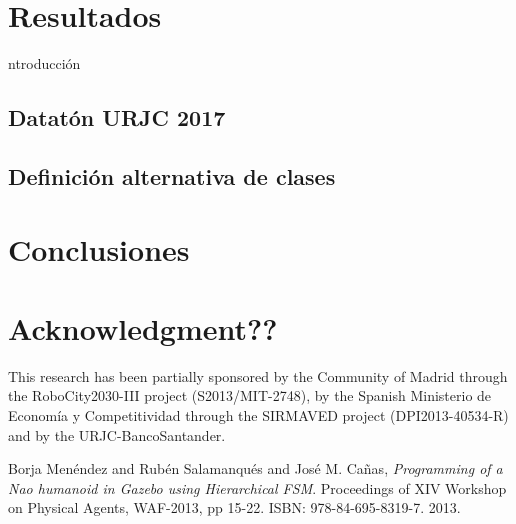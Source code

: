 \documentclass[journal,twoside]{JoPhA}
\begin{document}
\section{Resultados}
ntroducción
	\subsection{Datatón URJC 2017}

	\subsection{Definición alternativa de clases}


\section{Conclusiones}

\section*{Acknowledgment??}
This  research  has  been  partially  sponsored  by  the Community of Madrid through the RoboCity2030-III project (S2013/MIT-2748), by the Spanish Ministerio de Economía y Competitividad through the SIRMAVED project (DPI2013-40534-R) and by the URJC-BancoSantander.

\begin{thebibliography}{1}


Borja Men\'endez and Rubén Salamanqu\'es and Jos\'e M. Ca\~nas, \emph{Programming of a Nao humanoid in Gazebo using Hierarchical FSM}.  Proceedings of XIV Workshop on Physical Agents, WAF-2013, pp 15-22. ISBN: 978-84-695-8319-7. 2013.



\end{thebibliography}
\end{document}
